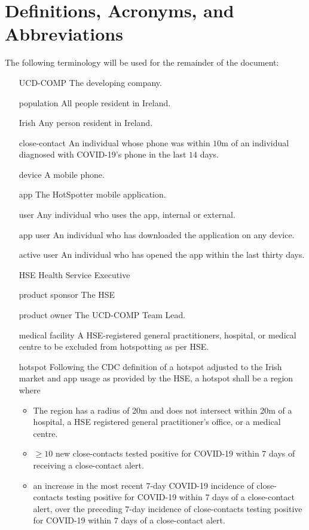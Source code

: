\documentclass{scrreprt}
\begin{document}
\section{Definitions, Acronyms, and Abbreviations}\label{Defn}
The following terminology will be used for the remainder of the document:
\begin{itemize}
	\item[UCD-COMP] The developing company.
	\item[population] All people resident in Ireland.
	\item[Irish] Any person resident in Ireland.
	\item[close-contact] An individual whose phone was within $10$m of an individual diagnosed with COVID-19's phone in the last $14$ days.
	\item[device] A mobile phone.
	\item[app] The HotSpotter mobile application.
	\item[user] Any individual who uses the app, internal or external.
	\item[app user] An individual who has downloaded the application on any device.
	\item[active user]An individual who has opened the app within the last thirty days.
	\item [HSE] Health Service Executive
	\item[product sponsor]The HSE
	\item[product owner]The UCD-COMP Team Lead.
	\item[medical facility]A HSE-registered general practitioners, hospital, or medical centre to be excluded from hotspotting as per HSE.
	\item[hotspot] Following the CDC definition of a hotspot adjusted to the Irish market and app usage as provided by the HSE, a hotspot shall be a region where
\begin{itemize}
	\item The region has a radius of 20m and does not intersect within 20m of a hospital, a HSE registered general practitioner's office, or a medical centre.
	\item  $\geq 10$ new close-contacts tested positive for COVID-19 within $7$ days of receiving a close-contact alert.
	\item an increase in the most recent $7$-day COVID-19 incidence of close-contacts testing positive for COVID-19 within $7$ days of a close-contact alert, over the preceding $7$-day incidence of close-contacts testing positive for COVID-19 within $7$ days of a close-contact alert.

\end{itemize}
\end{itemize}
\end{document}
